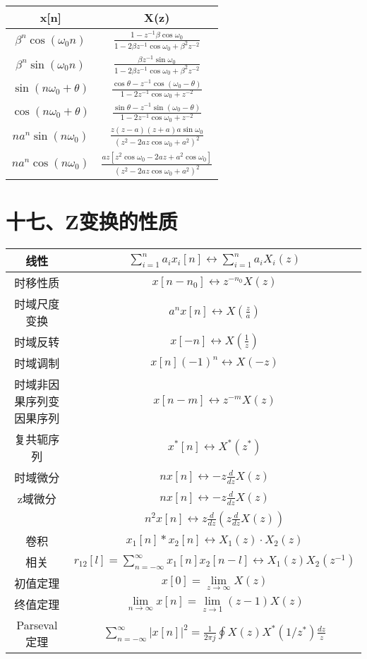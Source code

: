 \begin{tabular}{c|c}
x[n] & X(z) \\
\hline
$ \beta^{n}\cos(\omega_{0}n)$ & $\frac{1-z^{-1}\beta\cos\omega_{0}}{1-2\beta z^{-1}\cos\omega_{0}+\beta^{2}z^{-2}}$ \\
$ \beta^{n}\sin(\omega_{0}n) $ & $\frac{\beta z^{-1}\sin\omega_{0}}{1-2\beta z^{-1}\cos\omega_{0}+\beta^{2}z^{-2}}$ \\
$\sin(n\omega_{0}+\theta)$ & $\frac{\cos\theta-z^{-1}\cos(\omega_0 -\theta)}{1-2z^{-1}\cos\omega_{0}+z^{-2}}$ \\
$\cos(n\omega_{0}+\theta)$ & $\frac{\sin\theta-z^{-1}\sin(\omega_0 -\theta)}{1-2z^{-1}\cos\omega_{0}+z^{-2}}$ \\
$ na^n\sin(n\omega_{0}) $ & $\frac{z(z-a)(z+a)a\sin\omega_{0}}{(z^2-2az\cos\omega_0+a^2)^2}$ \\
$ na^n\cos(n\omega_{0}) $ & $\frac{az[z^2\cos\omega_0-2az+a^2\cos\omega_0]}{(z^2-2az\cos\omega_0+a^2)^2}$ \\
\end{tabular}

\section*{十七、Z变换的性质}

\begin{tabular}{c|c}
线性 & $\sum\limits_{i=1}^{n}a_i x_i[n] \leftrightarrow \sum\limits_{i=1}^{n}a_i X_i(z)$ \\
\hline
时移性质 & $x[n-n_0] \leftrightarrow z^{-n_0}X(z)$ \\
\hline
时域尺度变换 & $a^n x[n] \leftrightarrow X(\frac{z}{a})$ \\
\hline
时域反转 & $x[-n] \leftrightarrow X(\frac{1}{z})$ \\
\hline
时域调制 & $x[n](-1)^n \leftrightarrow X(-z)$ \\
\hline
时域非因果序列变因果序列 & $x[n-m] \leftrightarrow z^{-m}X(z)$ \\
\hline
复共轭序列 & $x^*[n] \leftrightarrow X^*(z^*)$ \\
\hline
时域微分 & $n x[n] \leftrightarrow -z \frac{d}{dz}X(z)$ \\
\hline
z域微分 & $n x[n] \leftrightarrow -z \frac{d}{dz}X(z)$ \\
 & $n^2 x[n] \leftrightarrow z \frac{d}{dz}(z \frac{d}{dz}X(z))$ \\
\hline
卷积 & $x_1[n] * x_2[n] \leftrightarrow X_1(z) \cdot X_2(z)$ \\
\hline
相关 & $r_{12}[l] = \sum\limits_{n=-\infty}^{\infty}x_1[n]x_2[n-l] \leftrightarrow X_1(z)X_2(z^{-1})$ \\
\hline
初值定理 & $x[0] = \lim\limits_{z \to \infty}X(z)$ \\
\hline
终值定理 & $\lim\limits_{n \to \infty}x[n] = \lim\limits_{z \to 1}(z-1)X(z)$ \\
\hline
Parseval定理 & $\sum\limits_{n=-\infty}^{\infty}|x[n]|^2 = \frac{1}{2\pi j}\oint X(z)X^*(1/z^*)\frac{dz}{z}$ \\
\end{tabular}

